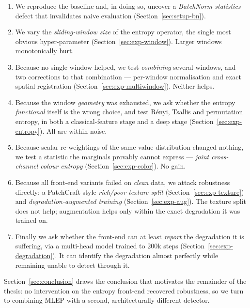 \begin{enumerate}
  \item We reproduce the baseline and, in doing so, uncover a
        \emph{BatchNorm statistics} defect that invalidates naive evaluation
        (Section~\ref{sec:setup-bn}).
  \item We vary the \emph{sliding-window size} of the entropy operator, the
        single most obvious hyper-parameter (Section~\ref{sec:exp-window}).
        Larger windows monotonically hurt.
  \item Because no single window helped, we test \emph{combining} several
        windows, and two corrections to that combination --- per-window
        normalisation and exact spatial registration
        (Section~\ref{sec:exp-multiwindow}). Neither helps.
  \item Because the window \emph{geometry} was exhausted, we ask whether the
        entropy \emph{functional} itself is the wrong choice, and test Rényi,
        Tsallis and permutation entropy, in both a classical-feature stage and
        a deep stage (Section~\ref{sec:exp-entropy}). All are within noise.
  \item Because scalar re-weightings of the same value distribution changed
        nothing, we test a statistic the marginals provably cannot express ---
        \emph{joint cross-channel colour entropy} (Section~\ref{sec:exp-color}).
        No gain.
  \item Because all front-end variants failed on \emph{clean} data, we attack
        robustness directly: a PatchCraft-style \emph{rich/poor texture split}
        (Section~\ref{sec:exp-texture}) and \emph{degradation-augmented
        training} (Section~\ref{sec:exp-aug}). The texture split does not help;
        augmentation helps only within the exact degradation it was trained on.
  \item Finally we ask whether the front-end can at least \emph{report} the
        degradation it is suffering, via a multi-head model trained to 200k
        steps (Section~\ref{sec:exp-degradation}). It can identify the
        degradation almost perfectly while remaining unable to detect through
        it.
\end{enumerate}

Section~\ref{sec:conclusion} draws the conclusion that motivates the remainder
of the thesis: no intervention on the entropy front-end recovered robustness,
so we turn to combining MLEP with a second, architecturally different detector.


